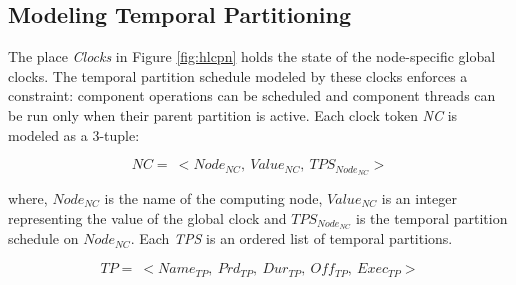 
\subsection{Modeling Temporal Partitioning}
The place \emph{Clocks} in Figure \ref{fig:hlcpn} holds the state of the node-specific global clocks. The temporal partition schedule modeled by these clocks enforces a constraint: component operations can be scheduled and component threads can be run only when their parent partition is active. Each clock token \emph{NC} is modeled as a 3-tuple:

\vspace{-0.15in}
\begin{equation}
\label{eq:NC}
NC = \ < Node_{NC}, \ Value_{NC}, \ TPS_{Node_{NC}} >
\end{equation}

where, $Node_{NC}$ is the name of the computing node, $Value_{NC}$ is an integer representing the value of the global clock and $TPS_{Node_{NC}}$ is the temporal partition schedule on $Node_{NC}$. Each \emph{TPS} is an ordered list of temporal partitions.

\vspace{-0.15in}
\begin{equation}
\label{eq:TP}
TP = \ < Name_{TP}, \ Prd_{TP}, \ Dur_{TP}, \ Off_{TP}, \ Exec_{TP} >
\end{equation}

